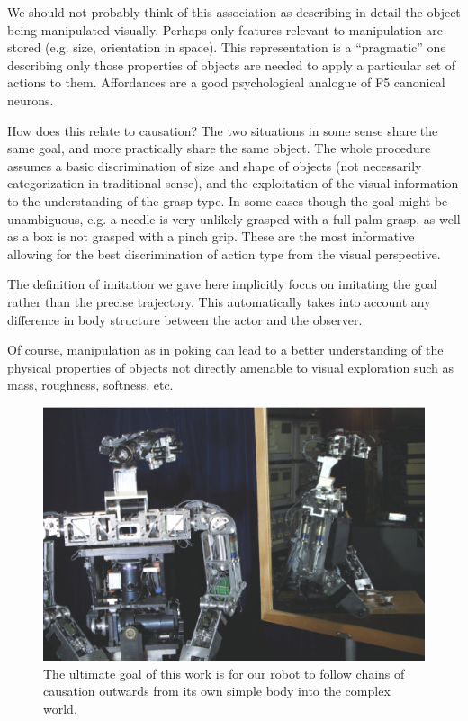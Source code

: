 We should not probably think of this association as describing in
detail the object being manipulated visually. Perhaps only features
relevant to manipulation are stored (e.g. size, orientation in space).
This representation is a ``pragmatic'' one describing only those
properties of objects are needed to apply a particular set of actions
to them. Affordances are a good psychological analogue of F5
canonical neurons.
\fi


\ifverbose
How does this relate to causation?  The two situations in some sense
share the same goal, and more practically share the same object.  The
whole procedure assumes a basic discrimination of size and shape of
objects (not necessarily categorization in traditional sense), and the
exploitation of the visual information to the understanding of the
grasp type. In some cases though the goal might be unambiguous, e.g. a
needle is very unlikely grasped with a full palm grasp, as well as a
box is not grasped with a pinch grip. These are the most informative
allowing for the best discrimination of action type from the visual
perspective.
\fi

\ifverbose
The definition of imitation we gave here implicitly focus on imitating
the goal rather than the precise trajectory. This automatically takes
into account any difference in body structure between the actor and
the observer.

Of course, manipulation as in poking can lead to a better
understanding of the physical properties of objects not directly
amenable to visual exploration such as mass, roughness, softness, etc.
\fi

\begin{figure}[tbh]
\begin{center}
\includegraphics[width=\columnwidth]{mirror-cog.eps}
\caption{ 
\label{fig:mirror-cog}
%
The ultimate goal of this work is for our robot to follow chains of
causation outwards from its own simple body into the complex world.
%
}
\end{center}
\end{figure}


